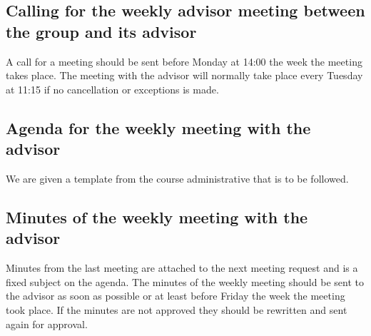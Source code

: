 \subsection{Calling for the weekly advisor meeting between the group and its advisor}
A call for a meeting should be sent before Monday at 14:00 the week the meeting takes place. The meeting with the advisor will normally take place every Tuesday at 11:15 if no cancellation or exceptions is made.

\subsection{Agenda for the weekly meeting with the advisor}
We are given a template from the course administrative that is to be followed.

\subsection{Minutes of the weekly meeting with the advisor}
Minutes from the last meeting are attached to the next meeting request and is a fixed subject on the agenda.
\newline
\newline
The minutes of the weekly meeting should be sent to the advisor as soon as possible or at least before Friday the week the meeting took place. If the minutes are not approved they should be rewritten and sent again for approval. 


